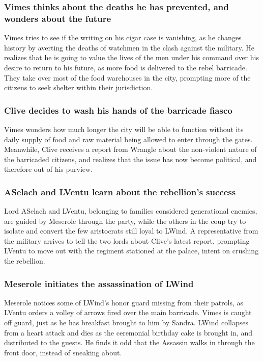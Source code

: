 \subsubsection{\Gls{Vimes} thinks about the deaths he has prevented, and wonders about the future}
\Gls{Vimes} tries to see if the writing on his cigar case is vanishing, as he changes history by
averting the deaths of watchmen in the clash against the military. He realizes that he is going to
value the lives of the men under his command over his desire to return to his future, as more food
is delivered to the rebel barricade. They take over most of the food warehouses in the city,
prompting more of the citizens to seek shelter within their jurisdiction.

\subsubsection{\Gls{Clive} decides to wash his hands of the barricade fiasco}
\Gls{Vimes} wonders how much longer the city will be able to function without its daily supply of
food and raw material being allowed to enter through the gates. Meanwhile, \Gls{Clive} receives a
report from \Gls{Wrangle} about the non-violent nature of the barricaded citizens, and realizes that
the issue has now become political, and therefore out of his purview.

\subsubsection{\Gls{ASelach} and \Gls{LVentu} learn about the rebellion's success}
Lord \Gls{ASelach} and \Gls{LVentu}, belonging to families considered generational enemies, are
guided by \Gls{Meserole} through the party, while the others in the coup try to isolate and convert
the few aristocrats still loyal to \Gls{LWind}. A representative from the military arrives to tell
the two lords about \Gls{Clive}'s latest report, prompting \Gls{LVentu} to move out with the
regiment stationed at the palace, intent on crushing the rebellion.

\subsubsection{\Gls{Meserole} initiates the assassination of \Gls{LWind}}
\Gls{Meserole} notices some of \Gls{LWind}'s honor guard missing from their patrols, as
\Gls{LVentu} orders a volley of arrows fired over the main barricade. \Gls{Vimes} is caught off
guard, just as he has breakfast brought to him by \Gls{Sandra}. \Gls{LWind} collapses from a
heart attack and dies as the ceremonial birthday cake is brought in, and distributed to the guests.
He finds it odd that the Assassin walks in through the front door, instead of sneaking about.

